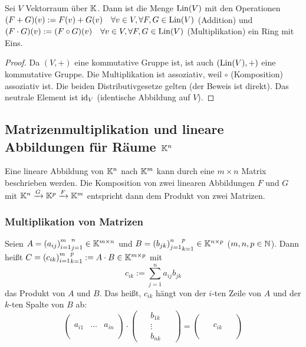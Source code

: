 \begin{propn}
	Sei $ V $ Vektorraum über $ \mathbb K $. Dann ist die Menge $ \operatorname{Lin}(V) $ mit den Operationen $ (F+G)(v) := F(v)+G(v) \quad \forall v \in V, \forall F,G \in \operatorname{Lin}(V) $ (Addition) und $ (F \cdot G)(v) := (F \circ G)(v) \quad \forall v \in V, \forall F,G \in \operatorname{Lin}(V) $ (Multiplikation) ein Ring mit Eins.
\end{propn}
\begin{proof}
	Da $ (V,+) $ eine kommutative Gruppe ist, ist auch $ (\operatorname{Lin}(V),+) $ eine kommutative Gruppe. Die Multiplikation ist assoziativ, weil $ \circ $ (Komposition) assoziativ ist. Die beiden Distributivgesetze gelten (der Beweis ist direkt). Das neutrale Element ist $ \operatorname{id}_V $ (identische Abbildung auf $ V $).
\end{proof}

\clearpage
\subsection{Matrizenmultiplikation und lineare Abbildungen für Räume $ \mathbb K^n $}

Eine lineare Abbildung von $\mathbb K^n$ nach $\mathbb K^m$ kann durch eine $m \times n$ Matrix beschrieben werden. Die Komposition von zwei linearen Abbildungen $F$ und $G$ mit $\mathbb K^n \xrightarrow{G} \mathbb K^p \xrightarrow{F} \mathbb K^m$ entspricht dann dem Produkt von zwei Matrizen. 

\subsubsection{Multiplikation von Matrizen}

Seien $ A = {{(a_{ij})}_{i=1}^m}_{j=1}^n \in \mathbb K^{m \times n} $ und $ B = {{(b_{jk})}_{j=1}^n}_{k=1}^p \in \mathbb K^{n \times p} $ ($ m,n,p \in \mathbb N $). Dann heißt $ C = {{(c_{ik})}_{i=1}^m}_{k=1}^p := A \cdot B \in \mathbb K^{m \times p} $ mit 
\[
	 c_{ik} := \sum_{j=1}^{n} a_{ij}b_{jk} 
\] das Produkt von $ A $ und $ B $. Das heißt, $c_{ik}$ hängt von der $i$-ten Zeile von $A$ und der $k$-ten Spalte von $B$ ab: 
\begin{equation*}
	\begin{pmatrix}
		\phantom{a} && \phantom{a} \\
		 a_{i1} & \ldots & a_{in} \\
		\phantom{a} && \phantom{a}
	\end{pmatrix}
	\cdot
	\begin{pmatrix}
		\phantom{b} & b_{1k} & \phantom{b} \\
		& \vdots & \\
		& b_{nk} &
	\end{pmatrix}
	=
	\begin{pmatrix}
		\phantom{c} && \phantom{c} \\
		& c_{ik} & \\
		\phantom{c} && \phantom{c}
	\end{pmatrix}
\end{equation*}

